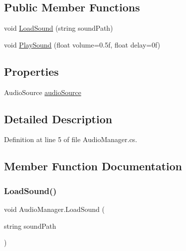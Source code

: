 \subsection*{Public Member Functions}
\begin{DoxyCompactItemize}
\item 
void \mbox{\hyperlink{class_audio_manager_a1520faf231d9b58d63a794f6b8040b99}{Load\+Sound}} (string sound\+Path)
\item 
void \mbox{\hyperlink{class_audio_manager_ac0f0dc189806848c224581b363b87396}{Play\+Sound}} (float volume=0.\+5f, float delay=0f)
\end{DoxyCompactItemize}
\subsection*{Properties}
\begin{DoxyCompactItemize}
\item 
Audio\+Source \mbox{\hyperlink{class_audio_manager_a0c2aea6ea779d69228564aca9476ea80}{audio\+Source}}
\end{DoxyCompactItemize}


\subsection{Detailed Description}


Definition at line 5 of file Audio\+Manager.\+cs.



\subsection{Member Function Documentation}
\mbox{\label{class_audio_manager_a1520faf231d9b58d63a794f6b8040b99}} 
\subsubsection{\texorpdfstring{LoadSound()}{LoadSound()}}
{\footnotesize\ttfamily void Audio\+Manager.\+Load\+Sound (\begin{DoxyParamCaption}\item[{string}]{sound\+Path }\end{DoxyParamCaption})}



